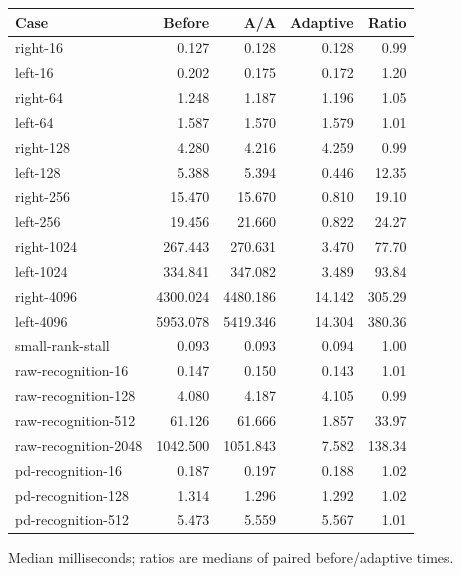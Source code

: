\begin{center}\small
\begin{tabular}{@{}lrrrr@{}}
\toprule
Case & Before & A/A & Adaptive & Ratio \\
\midrule
right-16 & 0.127 & 0.128 & 0.128 & 0.99 \\
left-16 & 0.202 & 0.175 & 0.172 & 1.20 \\
right-64 & 1.248 & 1.187 & 1.196 & 1.05 \\
left-64 & 1.587 & 1.570 & 1.579 & 1.01 \\
right-128 & 4.280 & 4.216 & 4.259 & 0.99 \\
left-128 & 5.388 & 5.394 & 0.446 & 12.35 \\
right-256 & 15.470 & 15.670 & 0.810 & 19.10 \\
left-256 & 19.456 & 21.660 & 0.822 & 24.27 \\
right-1024 & 267.443 & 270.631 & 3.470 & 77.70 \\
left-1024 & 334.841 & 347.082 & 3.489 & 93.84 \\
right-4096 & 4300.024 & 4480.186 & 14.142 & 305.29 \\
left-4096 & 5953.078 & 5419.346 & 14.304 & 380.36 \\
small-rank-stall & 0.093 & 0.093 & 0.094 & 1.00 \\
raw-recognition-16 & 0.147 & 0.150 & 0.143 & 1.01 \\
raw-recognition-128 & 4.080 & 4.187 & 4.105 & 0.99 \\
raw-recognition-512 & 61.126 & 61.666 & 1.857 & 33.97 \\
raw-recognition-2048 & 1042.500 & 1051.843 & 7.582 & 138.34 \\
pd-recognition-16 & 0.187 & 0.197 & 0.188 & 1.02 \\
pd-recognition-128 & 1.314 & 1.296 & 1.292 & 1.02 \\
pd-recognition-512 & 5.473 & 5.559 & 5.567 & 1.01 \\
\bottomrule
\end{tabular}
\end{center}
Median milliseconds; ratios are medians of paired before/adaptive times.
